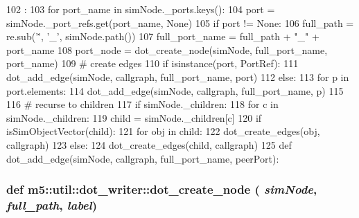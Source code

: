 \begin{DoxyCode}
102                                         :
103     for port_name in simNode._ports.keys():
104         port = simNode._port_refs.get(port_name, None)
105         if port != None:
106             full_path = re.sub('\.', '_', simNode.path())
107             full_port_name = full_path + "_" + port_name
108             port_node = dot_create_node(simNode, full_port_name, port_name)
109             # create edges
110             if isinstance(port, PortRef):
111                 dot_add_edge(simNode, callgraph, full_port_name, port)
112             else:
113                 for p in port.elements:
114                     dot_add_edge(simNode, callgraph, full_port_name, p)
115 
116     # recurse to children
117     if simNode._children:
118         for c in simNode._children:
119             child = simNode._children[c]
120             if isSimObjectVector(child):
121                 for obj in child:
122                     dot_create_edges(obj, callgraph)
123             else:
124                 dot_create_edges(child, callgraph)
125 
def dot_add_edge(simNode, callgraph, full_port_name, peerPort):
\end{DoxyCode}
\hypertarget{namespacem5_1_1util_1_1dot__writer_ad6620c2cbb99013162bcbc566c5b0378}{
\subsubsection[{dot\_\-create\_\-node}]{\setlength{\rightskip}{0pt plus 5cm}def m5::util::dot\_\-writer::dot\_\-create\_\-node ( {\em simNode}, \/   {\em full\_\-path}, \/   {\em label})}}
\label{namespacem5_1_1util_1_1dot__writer_ad6620c2cbb99013162bcbc566c5b0378}



